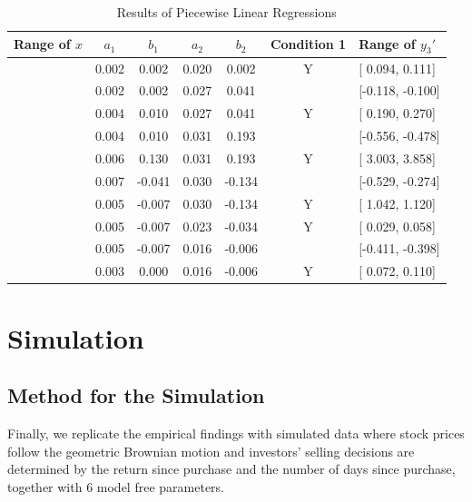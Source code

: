\documentclass[11pt, a4paper]{article}
\begin{document}
\begin{table}[ht] %
	\centering
	\caption{Results of Piecewise Linear Regressions}
	\label{table:segment}
	\begin{tabular}{lcccccl}
		\hline
		Range of $x$ & $a_1$ & $b_1$ & $a_2$ & $b_2$ & Condition 1 & Range of $y_3'$ \\ 
		\hline
		[-0.800, -0.171] & 0.002 &  0.002 & 0.020 &  0.002 & Y & [ 0.094,  0.111] \\ \relax
		[-0.171, -0.130] & 0.002 &  0.002 & 0.027 &  0.041 &   & [-0.118, -0.100] \\ \relax
		[-0.130, -0.030] & 0.004 &  0.010 & 0.027 &  0.041 & Y & [ 0.190,  0.270] \\ \relax
		[-0.030, -0.019] & 0.004 &  0.010 & 0.031 &  0.193 &   & [-0.556, -0.478] \\ \relax
		[-0.019,  0.000] & 0.006 &  0.130 & 0.031 &  0.193 & Y & [ 3.003,  3.858] \\ \relax
		[ 0.000,  0.063] & 0.007 & -0.041 & 0.030 & -0.134 &   & [-0.529, -0.274] \\ \relax
		[ 0.063,  0.069] & 0.005 & -0.007 & 0.030 & -0.134 & Y & [ 1.042,  1.120] \\ \relax
		[ 0.069,  0.248] & 0.005 & -0.007 & 0.023 & -0.034 & Y & [ 0.029,  0.058] \\ \relax
		[ 0.248,  0.291] & 0.005 & -0.007 & 0.016 & -0.006 &   & [-0.411, -0.398] \\ \relax
		[ 0.291,  0.800] & 0.003 &  0.000 & 0.016 & -0.006 & Y & [ 0.072,  0.110] \\ 
		\hline
	\end{tabular}
\end{table}




\section{Simulation}

\subsection{Method for the Simulation}
Finally, we replicate the empirical findings with simulated data where stock prices follow the geometric Brownian motion and investors' selling decisions are determined by the return since purchase and the number of days since purchase, together with 6 model free parameters.
\end{document}
